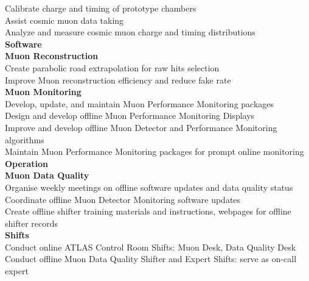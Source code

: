 \documentclass[letterpaper,11pt,oneside]{article}
\begin{document}
	\quad \quad Calibrate charge and timing of prototype chambers \\
	\quad \quad Assist cosmic muon data taking \\
	\quad \quad Analyze and measure cosmic muon charge and timing distributions \\
	\vspace{0.4cm}
 \textbf{Software}\\
	\vspace{0.1cm}
 	\quad \textbf{Muon Reconstruction}\\
	\quad \quad Create parabolic road extrapolation for raw hits selection \\
	\quad \quad Improve Muon reconstruction efficiency and reduce fake rate \\
	\vspace{0.1cm}
 	\quad \textbf{Muon Monitoring}\\
	\quad \quad Develop, update, and maintain Muon Performance Monitoring packages \\
	\quad \quad Design and develop offline Muon Performance Monitoring Displays \\
	\quad \quad Improve and develop offline Muon Detector and Performance Monitoring algorithms \\
	\quad \quad Maintain Muon Performance Monitoring packages for prompt online monitoring \\
	\vspace{0.4cm}
 \textbf{Operation}\\
	\vspace{0.1cm}
 	\quad \textbf{Muon Data Quality}\\
	\quad \quad Organise weekly meetings on offline software updates and data quality status \\
	\quad \quad Coordinate offline Muon Detector Monitoring software updates\\
	\quad \quad Create offline shifter training materials and instructions, webpages for offline shifter records  \\
	\vspace{0.1cm}
 	\quad \textbf{Shifts}\\
	\quad \quad Conduct online ATLAS Control Room Shifts: Muon Desk,  Data Quality Desk \\
	\quad \quad Conduct offline Muon Data Quality Shifter and Expert Shifts: serve as on-call expert \\
\end{document}
